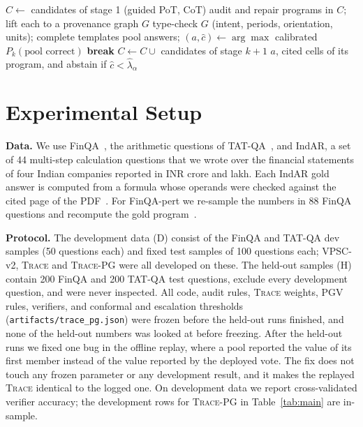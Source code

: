 \documentclass[conference]{IEEEtran}
\newcommand{\ours}{\textsc{Trace-PG}}
\newcommand{\trace}{\textsc{Trace}}
\begin{document}
\begin{algorithm}[t]
\caption{\ours{}$(T,P,q)$}
\label{alg:tracepg}
\small
\begin{algorithmic}[1]
\State $C \gets$ candidates of stage 1 (guided PoT, CoT)
  \State audit and repair programs in $C$; lift each to a provenance graph $G$
  \State type-check $G$ (intent, periods, orientation, units); complete templates
  \State pool answers; $(a,\hat c) \gets \arg\max$ calibrated $P_k(\text{pool correct})$
   \textbf{break} \EndIf
  \State $C \gets C \cup$ candidates of stage $k{+}1$
\EndFor
\State \Return $a$, cited cells of its program, and abstain if $\hat c < \hat\lambda_\alpha$
\end{algorithmic}
\end{algorithm}

\section{Experimental Setup}
\label{sec:setup}
\textbf{Data.} We use FinQA~\cite{finqa}, the arithmetic questions of TAT-QA~\cite{tatqa}, and IndAR, a set of 44 multi-step calculation questions that we wrote over the financial statements of four Indian companies reported in INR crore and lakh. Each IndAR gold answer is computed from a formula whose operands were checked against the cited page of the PDF~\cite{vpsc}. For FinQA-pert we re-sample the numbers in 88 FinQA questions and recompute the gold program~\cite{gsmsym}.

\textbf{Protocol.} The development data (D) consist of the FinQA and TAT-QA dev samples (50 questions each) and fixed test samples of 100 questions each; VPSC-v2, \trace{} and \ours{} were all developed on these. The held-out samples (H) contain 200 FinQA and 200 TAT-QA test questions, exclude every development question, and were never inspected. All code, audit rules, \trace{} weights, PGV rules, verifiers, and conformal and escalation thresholds (\texttt{artifacts/trace\_pg.json}) were frozen before the held-out runs finished, and none of the held-out numbers was looked at before freezing. After the held-out runs we fixed one bug in the offline replay, where a pool reported the value of its first member instead of the value reported by the deployed vote. The fix does not touch any frozen parameter or any development result, and it makes the replayed \trace{} identical to the logged one. On development data we report cross-validated verifier accuracy; the development rows for \ours{} in Table~\ref{tab:main} are in-sample.
\end{document}

